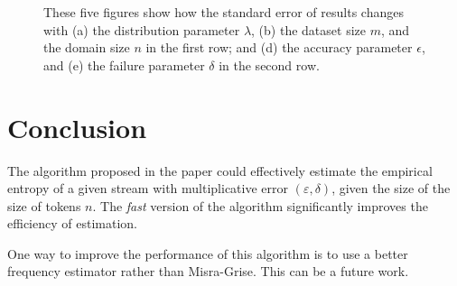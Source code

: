 \documentclass{scrartcl}
\begin{document}
\begin{figure}[t]
\caption{These five figures show how the standard error of results changes with (a) the distribution parameter $\lambda$, (b) the dataset size $m$, and the domain size $n$ in the first row; and (d) the accuracy parameter $\epsilon$, and (e) the failure parameter $\delta$ in the second row.}
\label{fig2}
\end{figure}

\section{Conclusion} %
\label{sec:conclusion}
The algorithm proposed in the paper \citep{chakrabarti2010near} could effectively estimate the empirical entropy of a given stream with multiplicative error $(\varepsilon,\delta)$, given the size of the size of tokens $n$. The \emph{fast} version of the algorithm significantly improves the efficiency of estimation. 

One way to improve the performance of this algorithm is to use a better frequency estimator rather than Misra-Grise. This can be a future work.

\end{document}
